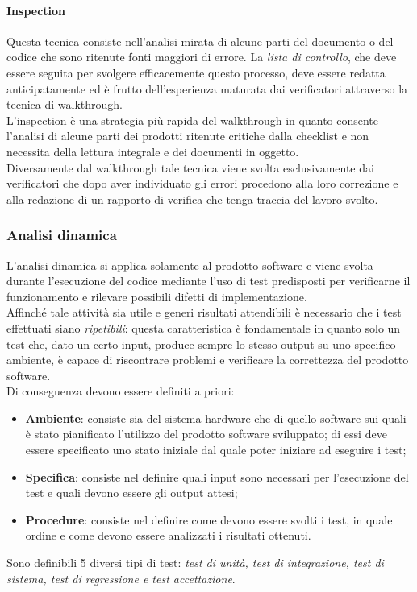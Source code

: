 \paragraph{Inspection}
Questa tecnica consiste nell'analisi mirata di alcune parti del documento o del codice che sono ritenute fonti maggiori di errore. La \textit{lista di controllo}, che deve essere seguita per svolgere efficacemente questo processo, deve essere redatta anticipatamente ed è frutto dell'esperienza maturata dai verificatori attraverso la tecnica di walkthrough.\\
L'inspection è una strategia più rapida del walkthrough in quanto consente l'analisi di alcune parti dei prodotti ritenute critiche dalla checklist e non necessita della lettura integrale e dei documenti in oggetto.\\
Diversamente dal walkthrough tale tecnica viene svolta esclusivamente dai verificatori che dopo aver individuato gli errori procedono alla loro correzione e alla redazione di un rapporto di verifica che tenga traccia del lavoro svolto.

\subsubsection{Analisi dinamica}
L'analisi dinamica si applica solamente al prodotto software e viene svolta durante l'esecuzione del codice mediante l'uso di test predisposti per verificarne il funzionamento e rilevare possibili difetti di implementazione.\\
Affinché tale attività sia utile e generi risultati attendibili è necessario che i test effettuati siano \textit{ripetibili}: questa caratteristica è fondamentale in quanto solo un test che, dato un certo input, produce sempre lo stesso output su uno specifico ambiente, è capace di riscontrare problemi e verificare la correttezza del prodotto software.\\
Di conseguenza devono essere definiti a priori:
\begin{itemize}
\item \textbf{Ambiente}: consiste sia del sistema hardware che di quello software sui quali è stato pianificato l'utilizzo del prodotto software sviluppato; di essi deve essere specificato uno stato iniziale dal quale poter iniziare ad eseguire i test;
\item \textbf{Specifica}: consiste nel definire quali input sono necessari per l'esecuzione del test e quali devono essere gli output attesi;
\item \textbf{Procedure}: consiste nel definire come devono essere svolti i test, in quale ordine e come devono essere analizzati i risultati ottenuti.
\end{itemize}
Sono definibili 5 diversi tipi di test: \textit{test di unità, test di integrazione, test di sistema, test di regressione e test accettazione}.

